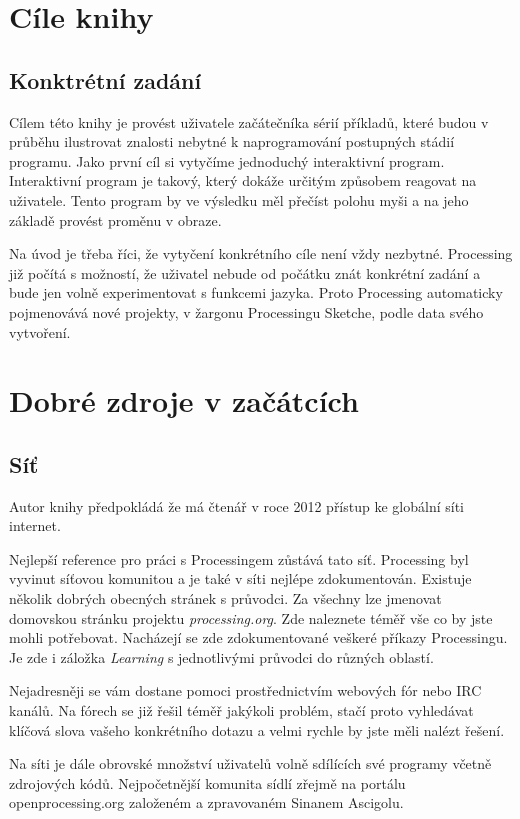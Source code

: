 \documentclass[10pt]{book}
\newcommand{\oddil}[1]{\section{#1}\index{#1}\label{#1}}
\begin{document}


\chapter{Cíle knihy}

\oddil{Konktrétní zadání}

Cílem této knihy je provést uživatele začátečníka sérií příkladů, které budou v průběhu ilustrovat znalosti nebytné k naprogramování postupných stádií programu. Jako první cíl si vytyčíme jednoduchý interaktivní program. Interaktivní program je takový, který dokáže určitým způsobem reagovat na uživatele. Tento program by ve výsledku měl přečíst polohu myši a na jeho základě provést proměnu v obraze.

Na úvod je třeba říci, že vytyčení konkrétního cíle není vždy nezbytné. Processing již počítá s možností, že uživatel nebude od počátku znát konkrétní zadání a bude jen volně experimentovat s funkcemi jazyka. Proto Processing automaticky pojmenovává nové projekty, v žargonu Processingu Sketche, podle data svého vytvoření.


\chapter{Dobré zdroje v začátcích}

\oddil{Síť}

Autor knihy předpokládá že má čtenář v roce 2012 přístup ke globální síti internet.

Nejlepší reference pro práci s Processingem zůstává tato síť. Processing byl vyvinut síťovou komunitou a je také v síti nejlépe zdokumentován. Existuje několik dobrých obecných stránek s průvodci. Za všechny lze jmenovat domovskou stránku projektu {\em processing.org}. Zde naleznete téměř vše co by jste mohli potřebovat. Nacházejí se zde zdokumentované veškeré příkazy Processingu. Je zde i záložka {\em Learning} s jednotlivými průvodci do různých oblastí. 

Nejadresněji se vám dostane pomoci prostřednictvím webových fór nebo IRC kanálů. Na fórech se již řešil téměř jakýkoli problém, stačí proto vyhledávat klíčová slova vašeho konkrétního dotazu a velmi rychle by jste měli nalézt řešení.
 
   Na síti je dále obrovské množství uživatelů volně sdílících své programy včetně zdrojových kódů. Nejpočetnější komunita sídlí zřejmě na portálu openprocessing.org založeném a zpravovaném Sinanem Ascigolu.
   
\end{document}
